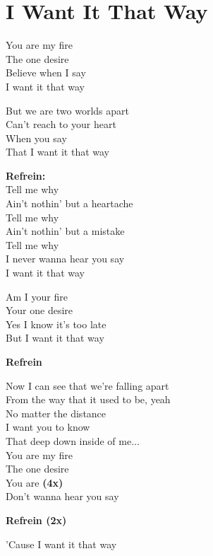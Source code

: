\section{I Want It That Way}
You are my fire\\
The one desire\\
Believe when I say\\
I want it that way

But we are two worlds apart\\
Can’t reach to your heart\\
When you say\\
That I want it that way

\textbf{Refrein:}\\
Tell me why\\
Ain’t nothin’ but a heartache\\
Tell me why\\
Ain’t nothin’ but a mistake\\
Tell me why\\
I never wanna hear you say\\
I want it that way

Am I your fire\\
Your one desire\\
Yes I know it’s too late\\
But I want it that way

\textbf{Refrein}

Now I can see that we’re falling apart\\
From the way that it used to be, yeah\\
No matter the distance\\
I want you to know\\
That deep down inside of me...\\
You are my fire\\
The one desire\\
You are \textbf{(4x)}\\
Don’t wanna hear you say

\textbf{Refrein (2x)}

’Cause I want it that way
